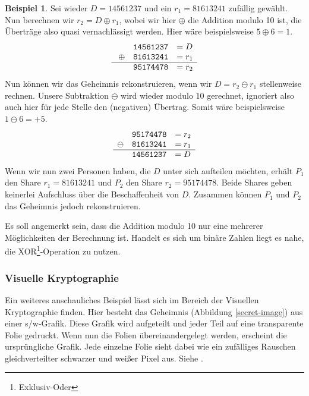 \documentclass[12pt, a4paper, oneside, titlepage]{report}
\theoremstyle{definition}
\newtheorem{bsp}[lemma]{Beispiel}
\begin{document}
	\begin{bsp}
	Sei wieder $ D = 14561237 $ und ein $ r_1 = 81613241 $ zufällig gewählt. Nun berechnen wir $ r_2 = D \oplus r_1 $, wobei wir hier $ \oplus $ die Addition modulo 10 ist, die Überträge also quasi vernachlässigt werden. Hier wäre beispielsweise $ 5 \oplus 6 = 1 $.
	$$\begin{array}{ccl}
 	 & \mathtt{14561237} & = D \\\
	\oplus & \mathtt{81613241} & = r_1 \\\hline
 	 & \mathtt{95174478} & = r_2 
	\end{array}$$
	Nun können wir das Geheimnis rekonstruieren, wenn wir $ D = r_2 \ominus r_1 $ stellenweise rechnen. Unsere Subtraktion $ \ominus $ wird wieder modulo 10 gerechnet, ignoriert also auch hier für jede Stelle den (negativen) Übertrag. Somit wäre beispielsweise $ 1 \ominus 6 = + 5 $.
	$$\begin{array}{ccl}
	 & \mathtt{95174478} & = r_2 \\
	\ominus & \mathtt{81613241} & = r_1 \\\hline
	 & \mathtt{14561237} & = D
	\end{array}$$
	Wenn wir nun zwei Personen haben, die $ D $ unter sich aufteilen möchten, erhält $ P_1 $ den Share $ r_1 = 81613241 $ und $ P_2 $ den Share $ r_2 = 95174478$. Beide Shares geben keinerlei Aufschluss über die Beschaffenheit von $ D $. Zusammen können $ P_1 $ und $ P_2 $ das Geheimnis jedoch rekonstruieren.
	\end{bsp}

	Es soll angemerkt sein, dass die Addition modulo 10 nur eine mehrerer Möglichkeiten der Berechnung ist. Handelt es sich um binäre Zahlen liegt es nahe, die XOR\footnote{Exklusiv-Oder}-Operation zu nutzen.
	
	\subsubsection{Visuelle Kryptographie}

	Ein weiteres anschauliches Beispiel lässt sich im Bereich der Visuellen Kryptographie finden. Hier besteht das Geheimnis (Abbildung \ref{secret-image}) aus einer s/w-Grafik. Diese Grafik wird aufgeteilt und jeder Teil auf eine transparente Folie gedruckt. Wenn nun die Folien übereinandergelegt werden, erscheint die ursprüngliche Grafik. Jede einzelne Folie sieht dabei wie ein zufälliges Rauschen gleichverteilter schwarzer und weißer Pixel aus. Siehe \cite{shamir_naor}.
	
\end{document}
